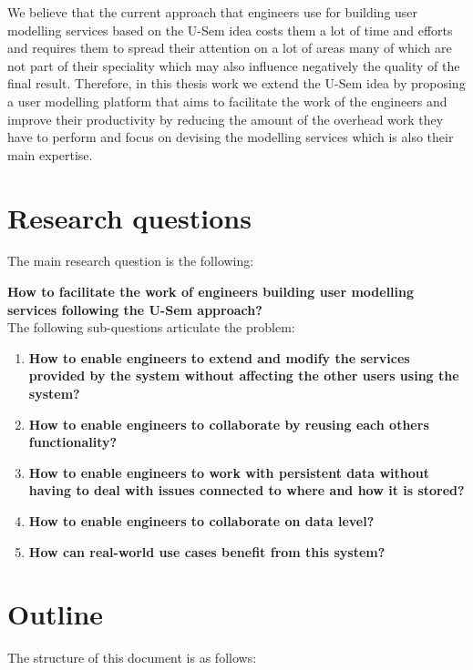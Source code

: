 We believe that the current approach that engineers use for building user modelling services based on the U-Sem idea costs them a lot of time and efforts and requires them to spread their attention on a lot of areas many of which are not part of their speciality which may also influence negatively the quality of the final result. Therefore, in this thesis work we extend the U-Sem idea by proposing a user modelling platform that aims to facilitate the work of the engineers and improve their productivity by reducing the amount of the overhead work they have to perform and focus on devising the modelling services which is also their main expertise.


\section{Research questions}

The main research question is the following:

\textbf{How to facilitate the work of engineers building user modelling services following the U-Sem approach?}\\

The following sub-questions articulate the problem:

\begin{enumerate}
\item \textbf{How to enable engineers to extend and modify the services provided by the system without affecting the other users using the system?}

\item \textbf{How to enable engineers to collaborate by reusing each others functionality?}

\item \textbf{How to enable engineers to work with persistent data without having to deal with issues connected to where and how it is stored?}

\item \textbf{How to enable engineers to collaborate on data level?}

\item \textbf{How can real-world use cases benefit from this system?}

\end{enumerate}


\section{Outline}
The structure of this document is as follows:

